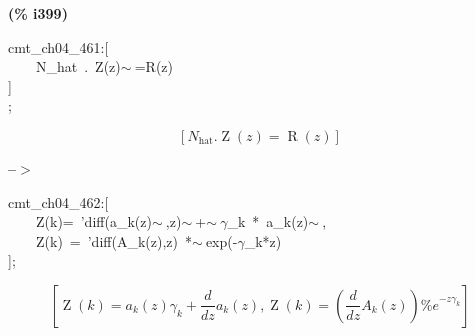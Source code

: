 \documentclass[fleqn]{article}
\begin{document}
\noindent
\begin{minipage}[t]{4.000000em}\color{red}\bfseries
(\% i399)	
\end{minipage}
\begin{minipage}[t]{\textwidth}\color{blue}
cmt\_ch04\_461:[\\
\ \ \ \ N\_hat\ .\ Z(z)\ensuremath{\sim\ }=R(z)\\
]\\
;
\end{minipage}
\[\displaystyle \tag{\% o399} 
\left[ {N_{\ensuremath{\mathrm{hat}}}}\ensuremath{\mathrm{ . }}\operatorname{Z}(z)=\operatorname{R}(z)\right] \mbox{}
\]


\noindent
\begin{minipage}[t]{4.000000em}\color{red}\bfseries
 --\ensuremath{\ensuremath{>}}	
\end{minipage}
\begin{minipage}[t]{\textwidth}\color{blue}
cmt\_ch04\_462:[\\
\ \ \ \ Z(k)=\ 'diff(a\_k(z)\ensuremath{\sim\ },z)\ensuremath{\sim\ }+\ensuremath{\sim\ }\ensuremath{\gamma}\_k\ *\ a\_k(z)\ensuremath{\sim\ },\\
\ \ \ \ Z(k)\ =\ 'diff(A\_k(z),z)\ *\ensuremath{\sim\ }exp(-\ensuremath{\gamma}\_k*z)\\
];
\end{minipage}
\[\displaystyle \tag{\% o400} 
\left[ \operatorname{Z}(k)={a_k}(z) {{\gamma }_k}+\frac{d}{d z} {a_k}(z)\operatorname{,}\operatorname{Z}(k)=\left( \frac{d}{d z} {A_k}(z)\right)  {{\% e}^{-z {{\gamma }_k}}}\right] \mbox{}
\]
\end{document}
